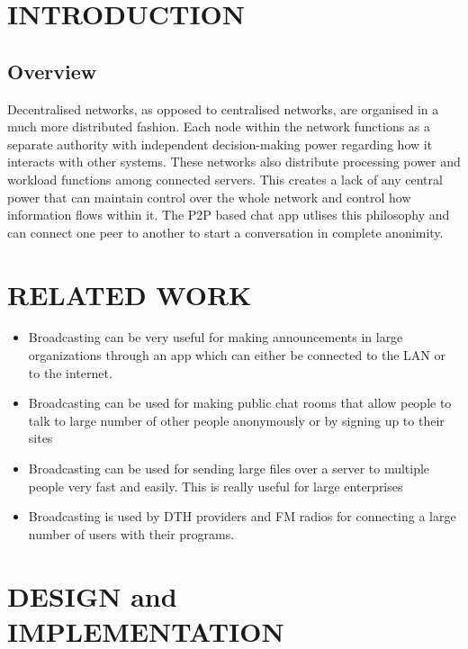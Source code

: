 \documentclass{fisatproject}
\begin{document}
\restoregeometry
\tableofcontents

\newpage
\pagestyle{fancy}


\chapter{INTRODUCTION}
\setcounter{page}{1}
\renewcommand{\baselinestretch}{1.50}
\section{Overview}
Decentralised networks, as opposed to centralised networks, are organised in a much more distributed fashion. Each node within the network functions as a separate authority with independent decision-making power regarding how it interacts with other systems. These networks also distribute processing power and workload functions among connected servers. This creates a lack of any central power that can maintain control over the whole network and control how information flows within it. The P2P based chat app utlises this philosophy and can connect one peer to another to start a conversation in complete anonimity.


\chapter{RELATED WORK}

\begin{itemize}
	\item Broadcasting can be very useful for making announcements in large organizations through an app which can either be connected to the LAN or to the internet. 

	\item Broadcasting can be used for making public chat rooms that allow people to talk to large number of other people anonymously or by signing up to their sites

	\item Broadcasting can be used for sending large files over a server to multiple people very fast and easily. This is really useful for large enterprises

	\item Broadcasting is used by DTH providers and FM radios for connecting a large number of users with their programs.
\end{itemize}


\chapter{DESIGN and IMPLEMENTATION}
\end{document}
